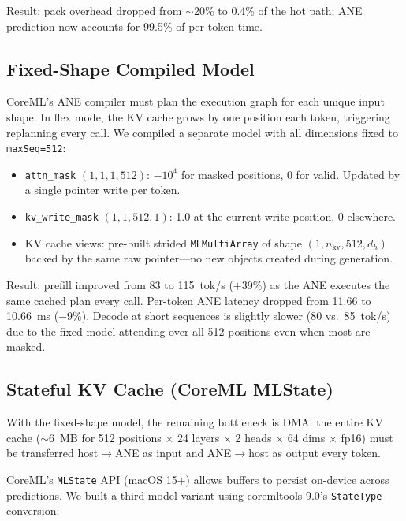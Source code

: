 \documentclass[11pt,twocolumn]{article}
\begin{document}
Result: pack overhead dropped from $\sim$20\% to 0.4\% of the hot
path; ANE prediction now accounts for 99.5\% of per-token time.

\subsection{Fixed-Shape Compiled Model}

CoreML's ANE compiler must plan the execution graph for each unique
input shape.  In flex mode, the KV cache grows by one position each
token, triggering replanning every call.  We compiled a separate model
with all dimensions fixed to \texttt{maxSeq=512}:

\begin{itemize}
\item \texttt{attn\_mask} $(1, 1, 1, 512)$: $-10^4$ for masked
  positions, 0 for valid.  Updated by a single pointer write per
  token.
\item \texttt{kv\_write\_mask} $(1, 1, 512, 1)$: 1.0 at the current
  write position, 0 elsewhere.
\item KV cache views: pre-built strided \texttt{MLMultiArray} of shape
  $(1, n_\text{kv}, 512, d_h)$ backed by the same raw pointer---no
  new objects created during generation.
\end{itemize}

Result: prefill improved from 83 to 115~tok/s ($+$39\%) as the ANE
executes the same cached plan every call.  Per-token ANE latency
dropped from 11.66 to 10.66~ms ($-$9\%).  Decode at short sequences is
slightly slower (80 vs.\ 85~tok/s) due to the fixed model attending
over all 512 positions even when most are masked.

\subsection{Stateful KV Cache (CoreML MLState)}

With the fixed-shape model, the remaining bottleneck is DMA: the
entire KV cache ($\sim$6~MB for 512 positions $\times$ 24 layers
$\times$ 2 heads $\times$ 64 dims $\times$ fp16) must be transferred
host$\to$ANE as input and ANE$\to$host as output every token.

CoreML's \texttt{MLState} API (macOS 15+) allows buffers to persist
on-device across predictions.  We built a third model variant using
coremltools 9.0's \texttt{StateType} conversion:
\end{document}
